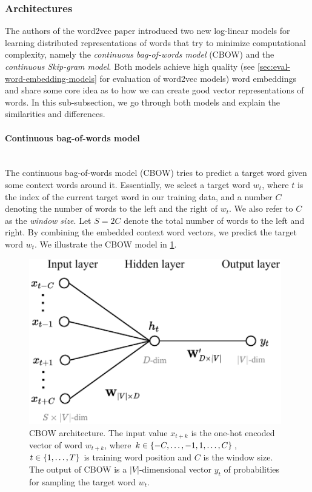 \subsubsection{Architectures}
The authors of the word2vec paper introduced two new log-linear models for learning distributed representations of words that try to minimize computational complexity, namely the \textit{continuous bag-of-words model} (CBOW) and the \textit{continuous Skip-gram model}. Both models achieve high quality (see \cref{sec:eval-word-embedding-models} for evaluation of word2vec models) word embeddings and share some core idea as to how we can create good vector representations of words. In this sub-subsection, we go through both models and explain the similarities and differences.

\paragraph*{Continuous bag-of-words model}\mbox{} \\
The continuous bag-of-words model (CBOW) tries to predict a target word given some context words around it. Essentially, we select a target word $w_t$, where $t$ is the index of the current target word in our training data, and a number $C$ denoting the number of words to the left and the right of $w_t$. We also refer to $C$ as the \textit{window size}. Let $S=2C$ denote the total number of words to the left and right. By combining the embedded context word vectors, we predict the target word $w_t$. We illustrate the CBOW model in \cref{fig:cbow-model}.
\begin{figure}[H]
    \centering
    \includegraphics[width=11cm]{thesis/figures/cbow_cropped.pdf}
    \caption{CBOW architecture. The input value $x_{t+k}$ is the one-hot encoded vector of word $w_{t+k}$, where $k \in \left\{-C, \ldots, -1, 1, \ldots, C\right\}$, $t \in \left\{1, \ldots, T\right\}$ is training word position and $C$ is the window size. The output of CBOW is a $|V|$-dimensional vector $y_t$ of probabilities for sampling the target word $w_t$.}
    \label{fig:cbow-model}
\end{figure}

